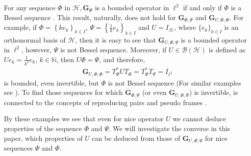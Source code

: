 \documentclass{birkjour}
\theoremstyle{definition}
\theoremstyle{remark}
\numberwithin{equation}{section}
\newcommand{\BL}[1]{
{\mathcal B} \left( #1 \right)
}
\begin{document}
For any sequence $\Phi$ in $\mathcal{H},\mathbf{G}_{\Phi}$ is a
bounded operator in $\ell^{2}$ if and only if $\Phi$ is a Bessel
sequence \cite{Chr08}. This result, naturally, does not hold for
$\mathbf{G}_{\Phi,\Psi}$ and $\mathbf{G}_{U,\Phi,\Phi}$. For
example, if $\Phi=\left\{ke_{k}\right\}_{k\in I}$,
$\Psi=\left\{\frac{1}{k}e_{k}\right\}_{k\in I}$ and
$U=I_{\mathcal{H}}$, where $\{e_{k}\}_{k\in I}$ is an orthonormal
basis of $\mathcal{H}$, then it is easy to see that
$\mathbf{G}_{U,\Phi,\Psi}$ is a bounded operator in $\ell^{2}$,
however, $\Psi$ is not  Bessel sequence. Moreover, if $U\in
\BL{\mathcal{H}}$ is defined as $Ue_{k}=\frac{1}{k^2}e_{k}$, $k\in
\mathbb{N}$, then $U\Phi=\Psi$, and therefore,
\begin{eqnarray*}
\mathbf{G}_{U,\Phi,\Phi}=T_{\Phi}^*UT_{\Phi}=T_{\Phi}^*T_{\Psi}=I_{\ell^{2}}
\end{eqnarray*}
is bounded, even invertible, but $\Phi$ is not Bessel sequence (For similar examples see \cite{bstable09}).
To find those sequences for which $\mathbf{G}_{\Phi,\Psi}$ (or even $\mathbf{G}_{U,\Phi,\Psi}$) is invertible, is connected to the concepts of reproducing pairs \cite{spexxl14} and pseudo frames \cite{liog04}. 

By these examples we see that even for nice operator $U$ we cannot deduce properties of the sequence $\Phi$ and $\Psi$.
We will investigate the converse in this paper, which properties of $U$ can be deduced from those of $\mathbf{G}_{U,\Phi,\Psi}$ for nice sequences $\Psi$ and $\Phi$.
\end{document}
